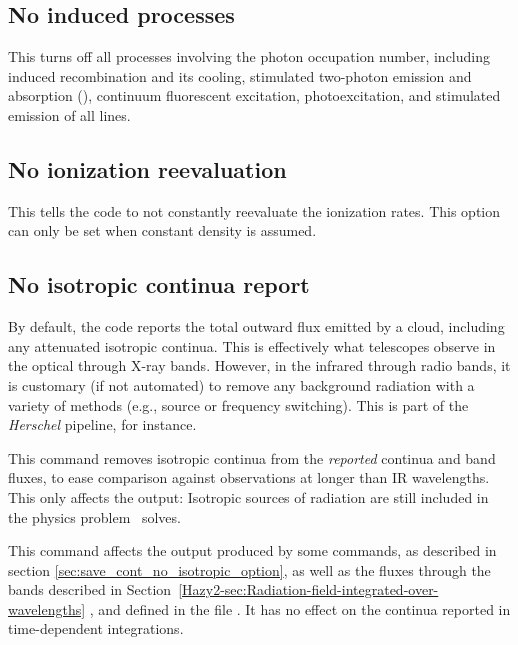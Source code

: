 \subsection{No induced processes}

This turns off all processes involving the photon occupation number, including induced recombination and its cooling, stimulated
two-photon emission and absorption (\citealp{Bottorff2006}), continuum
fluorescent excitation, photoexcitation, and stimulated emission of all lines.

\subsection{No ionization reevaluation}

This tells the code to not constantly reevaluate the ionization rates.
This option can only be set when constant density is assumed.

\subsection{No isotropic continua report}
\label{sec:no_isotropic_continua}

By default, the code reports the total outward flux emitted
by a cloud, including any attenuated isotropic continua.
This is effectively what telescopes observe in the optical
through X-ray bands.
However, in the infrared through radio bands, it is customary
(if not automated) to remove any background radiation with a
variety of methods (e.g., source or frequency switching).
This is part of the {\em Herschel} pipeline, for instance.

\par
This command removes isotropic continua from the {\it reported}
continua and band fluxes, to ease comparison against observations
at longer than IR wavelengths.
This only affects the output:
Isotropic sources of radiation are still included in the physics
problem \Cloudy\ solves.

\par
This command affects the output produced by some  commands,
as described in section \ref{sec:save_cont_no_isotropic_option},
as well as the fluxes through the bands described in
Section~\ref{Hazy2-sec:Radiation-field-integrated-over-wavelengths}
,
and defined in the file .
It has no effect on the continua reported in time-dependent
integrations.

